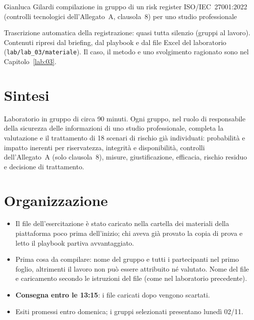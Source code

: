   {Gianluca Gilardi}
  {compilazione in gruppo di un risk register ISO/IEC~27001:2022 (controlli tecnologici dell'Allegato~A,
   clausola~8) per uno studio professionale}
\label{lez:2026-10-30}

\begin{nota}[Fonte]
Trascrizione automatica della registrazione: quasi tutta silenzio (gruppi al lavoro). Contenuti ripresi
dal briefing, dal playbook e dal file Excel del laboratorio (\texttt{lab/lab\_03/materiale}). Il caso,
il metodo e uno svolgimento ragionato sono nel Capitolo~\ref{lab:03}.
\end{nota}

\section{Sintesi}
Laboratorio in gruppo di circa 90 minuti. Ogni gruppo, nel ruolo di responsabile della sicurezza delle
informazioni di uno studio professionale, completa la valutazione e il trattamento di 18 scenari di
rischio già individuati: probabilità e impatto inerenti per riservatezza, integrità e disponibilità,
controlli dell'Allegato~A (solo clausola~8), misure, giustificazione, efficacia, rischio residuo e
decisione di trattamento.

\section{Organizzazione}
\begin{itemize}
  \item Il file dell'esercitazione è stato caricato nella cartella dei materiali della piattaforma poco
    prima dell'inizio; chi aveva già provato la copia di prova e letto il playbook partiva avvantaggiato.
  \item Prima cosa da compilare: nome del gruppo e tutti i partecipanti nel primo foglio, altrimenti il
    lavoro non può essere attribuito né valutato. Nome del file e caricamento secondo le istruzioni del
    file (come nel laboratorio precedente).
  \item \textbf{Consegna entro le 13:15}: i file caricati dopo vengono scartati.
  \item Esiti promessi entro domenica; i gruppi selezionati presentano lunedì 02/11.
\end{itemize}

